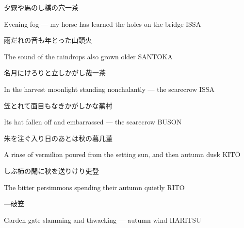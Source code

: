 \begin{haiku}
    {\FH 夕霧や馬のし橋の穴}\hfill{\FH 一茶}

    \vin{} Evening fog ---
    \vin{} \vin{} my horse has learned
    \vin{} \vin{} \vin{} the holes on the bridge \hspace{\fill} ISSA
\end{haiku}

\begin{haiku}
    {\FH 雨だれの音も年とった}\hfill{\FH 山頭火}

    \vin{} The sound
    \vin{} \vin{} of the raindrops
    \vin{} \vin{} \vin{} also grown older \hspace{\fill} SANT\={O}KA
\end{haiku}

\begin{haiku}
    {\FH 名月にけろりと立しかがし哉}\hfill{\FH 一茶}

    \vin{} In the harvest moonlight
    \vin{} \vin{} standing nonchalantly ---
    \vin{} \vin{} \vin{} the scarecrow \hspace{\fill} ISSA
\end{haiku}

\begin{haiku}
    {\FH 笠とれて面目もなきかがしかな}\hfill{\FH 蕪村}

    \vin{} Its hat fallen off
    \vin{} \vin{} and embarrassed ---
    \vin{} \vin{} \vin{} the scarecrow \hspace{\fill} BUSON
\end{haiku}

\begin{haiku}
    {\FH 朱を注ぐ入り日のあとは秋の暮}\hfill{\FH 几董}

    \vin{} A rinse of vermilion poured
    \vin{} \vin{} from the setting sun, and then
    \vin{} \vin{} \vin{} autumn dusk \hspace{\fill} KIT\=O
\end{haiku}

\begin{haiku}
    {\FH しぶ柿の閑に秋を送りけり}\hfill{\FH 吏登}

    \vin{} The bitter persimmons
    \vin{} \vin{} spending their autumn
    \vin{} \vin{} \vin{} quietly \hspace{\fill} RIT\={O}
\end{haiku}

\begin{haiku}
    {---}\hfill{\FH 破笠}

    \vin{} Garden gate
    \vin{} \vin{} slamming and thwacking ---
    \vin{} \vin{} \vin{} autumn wind \hspace{\fill} HARITSU
\end{haiku}

